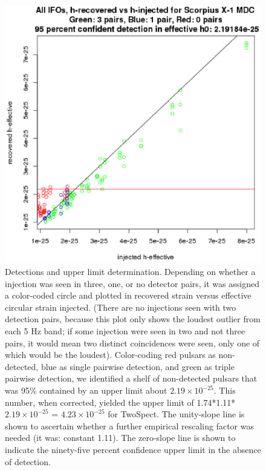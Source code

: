 \begin{figure}
\begin{center}
\includegraphics[trim=0 10 10 5, clip, width=0.70\paperwidth,height=0.48\paperheight]{HrecoveredVsHeffectiveFullUL.eps}
\caption{Detections and upper limit determination.
Depending on whether a injection was seen in three, one, or no detector pairs, it was assigned a color-coded circle and plotted in recovered strain versus effective circular strain injected.
(There are no injections seen with two detection pairs, because this plot only shows the loudest outlier from each 5 Hz band; if some injection were seen in two and not three pairs, it would mean two distinct coincidences were seen, only one of which would be the loudest).
Color-coding red pulsars as non-detected, blue as single pairwise detection, and green as triple pairwise detection, we identified a shelf of non-detected pulsars that was 95\% contained by an upper limit about $2.19 \times 10^{-25}$. This number, when corrected, yielded the upper limit of 1.74*1.11*$2.19 \times 10^{-25}$ = $4.23 \times 10^{-25}$ for TwoSpect. 
The unity-slope line is shown to ascertain whether a further empirical rescaling factor was needed (it was: constant 1.11).
The zero-slope line is shown to indicate the ninety-five percent confidence upper limit in the absence of detection.
\label{fig:hrecoveredvsheffectivefullul}}
\end{center}
\end{figure}


